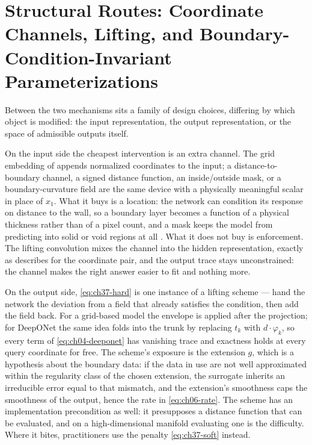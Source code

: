 \section{Structural Routes: Coordinate Channels, Lifting, and Boundary-Condition-Invariant Parameterizations}
\label{sec:ch37-structural}

Between the two mechanisms sits a family of design choices, differing by which object is modified:
the input representation, the output representation, or the space of admissible outputs itself.

On the input side the cheapest intervention is an extra channel. The grid embedding of
 appends normalized coordinates to the
input; a distance-to-boundary channel, a signed distance function, an inside/outside mask, or a
boundary-curvature field are the same device with a physically meaningful scalar in place of $x_1$.
What it buys is a location: the network can condition its response on distance to the wall, so a
boundary layer becomes a function of a physical thickness rather than of a pixel count, and a mask
keeps the model from predicting into solid or void regions at all
. What it does not buy is enforcement. The lifting
convolution mixes the channel into the hidden representation, exactly as
 describes for the coordinate pair, and
the output trace stays unconstrained: the channel makes the right answer easier to fit and nothing
more.

On the output side, \eqref{eq:ch37-hard} is one instance of a lifting scheme --- hand the network the
deviation from a field that already satisfies the condition, then add the field back. For a
grid-based model the envelope is applied after the projection; for DeepONet the same idea folds into
the trunk by replacing $t_k$ with $d\cdot\varphi_k$, so every term of \eqref{eq:ch04-deeponet} has
vanishing trace and exactness holds at every query coordinate for free. The scheme's exposure is the
extension $g$, which is a hypothesis about the boundary data: if the data in use are not well
approximated within the regularity class of the chosen extension, the surrogate inherits an
irreducible error equal to that mismatch, and the extension's smoothness caps the smoothness of the
output, hence the rate in \eqref{eq:ch06-rate}. The scheme has an implementation precondition as
well: it presupposes a distance function that can be evaluated, and on a high-dimensional manifold
evaluating one is the difficulty. Where it bites, practitioners use the penalty
\eqref{eq:ch37-soft} instead.

